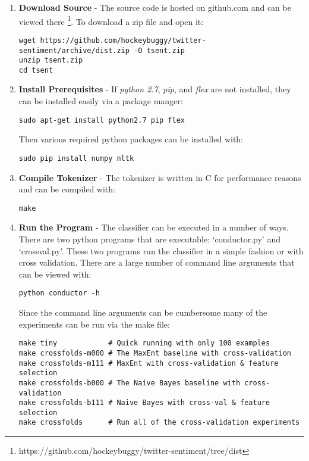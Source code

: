 \documentclass[final,3p,12pt]{elsarticle}
\begin{document}
\begin{enumerate}

    \item \textbf{Download Source} - The source code is hosted on github.com
        and can be viewed there
        \footnote{https://github.com/hockeybuggy/twitter-sentiment/tree/dist}.
        To download a zip file and open it:

\begin{Verbatim}[fontsize=\footnotesize]
wget https://github.com/hockeybuggy/twitter-sentiment/archive/dist.zip -O tsent.zip
unzip tsent.zip
cd tsent
\end{Verbatim}


    \item \textbf{Install Prerequisites} - If \textit{python 2.7},
        \textit{pip}, and \textit{flex} are not installed, they can be
        installed easily via a package manger:

\begin{Verbatim}[fontsize=\footnotesize]
sudo apt-get install python2.7 pip flex
\end{Verbatim}

Then various required python packages can be installed with:

\begin{Verbatim}[fontsize=\footnotesize]
sudo pip install numpy nltk
\end{Verbatim}

    \item \textbf{Compile Tokenizer} - The tokenizer is written in C for
        performance reasons and can be compiled with:
\begin{Verbatim}[fontsize=\footnotesize]
make
\end{Verbatim}

    \item \textbf{Run the Program} - The classifier can be executed in a number
        of ways. There are two python programs that are executable:
        `conductor.py' and `crossval.py'. These two programs run the classifier
        in a simple fashion or with cross validation. There are a large number
        of command line arguments that can be viewed with:

\begin{Verbatim}[fontsize=\footnotesize]
python conductor -h
\end{Verbatim}

Since the command line arguments can be cumbersome many of the experiments can
be run via the make file:

\begin{Verbatim}[fontsize=\footnotesize]
make tiny            # Quick running with only 100 examples
make crossfolds-m000 # The MaxEnt baseline with cross-validation
make crossfolds-m111 # MaxEnt with cross-validation & feature selection
make crossfolds-b000 # The Naive Bayes baseline with cross-validation
make crossfolds-b111 # Naive Bayes with cross-val & feature selection
make crossfolds      # Run all of the cross-validation experiments
\end{Verbatim}

\end{enumerate}
\end{document}
